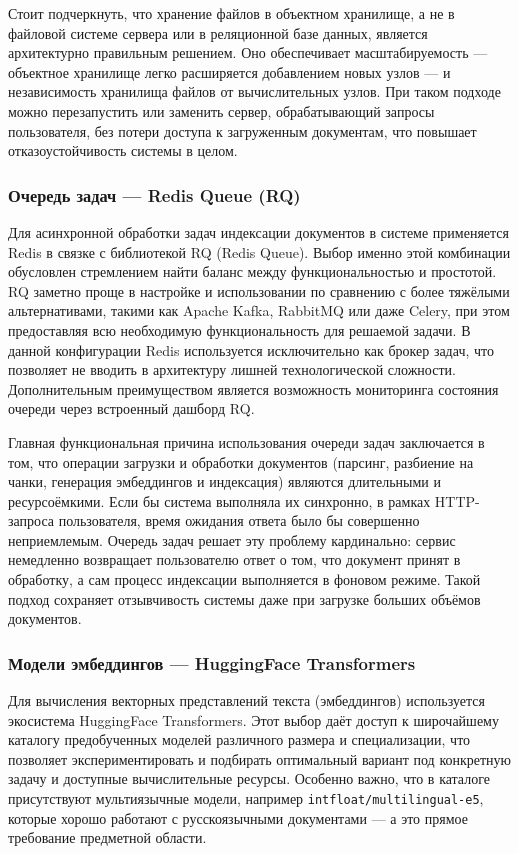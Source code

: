Стоит подчеркнуть, что хранение файлов в объектном хранилище, а не в файловой системе сервера или в реляционной базе данных, является архитектурно правильным решением. Оно обеспечивает масштабируемость — объектное хранилище легко расширяется добавлением новых узлов — и независимость хранилища файлов от вычислительных узлов. При таком подходе можно перезапустить или заменить сервер, обрабатывающий запросы пользователя, без потери доступа к загруженным документам, что повышает отказоустойчивость системы в целом.


\subsubsection{Очередь задач — Redis Queue (RQ)}

Для асинхронной обработки задач индексации документов в системе применяется Redis в связке с библиотекой RQ (Redis Queue). Выбор именно этой комбинации обусловлен стремлением найти баланс между функциональностью и простотой. RQ заметно проще в настройке и использовании по сравнению с более тяжёлыми альтернативами, такими как Apache Kafka, RabbitMQ или даже Celery, при этом предоставляя всю необходимую функциональность для решаемой задачи. В данной конфигурации Redis используется исключительно как брокер задач, что позволяет не вводить в архитектуру лишней технологической сложности. Дополнительным преимуществом является возможность мониторинга состояния очереди через встроенный дашборд RQ.

Главная функциональная причина использования очереди задач заключается в том, что операции загрузки и обработки документов (парсинг, разбиение на чанки, генерация эмбеддингов и индексация) являются длительными и ресурсоёмкими. Если бы система выполняла их синхронно, в рамках HTTP-запроса пользователя, время ожидания ответа было бы совершенно неприемлемым. Очередь задач решает эту проблему кардинально: сервис немедленно возвращает пользователю ответ о том, что документ принят в обработку, а сам процесс индексации выполняется в фоновом режиме. Такой подход сохраняет отзывчивость системы даже при загрузке больших объёмов документов.

\subsubsection{Модели эмбеддингов — HuggingFace Transformers}

Для вычисления векторных представлений текста (эмбеддингов) используется экосистема HuggingFace Transformers. Этот выбор даёт доступ к широчайшему каталогу предобученных моделей различного размера и специализации, что позволяет экспериментировать и подбирать оптимальный вариант под конкретную задачу и доступные вычислительные ресурсы. Особенно важно, что в каталоге присутствуют мультиязычные модели, например \texttt{intfloat/multilingual-e5}, которые хорошо работают с русскоязычными документами — а это прямое требование предметной области.

